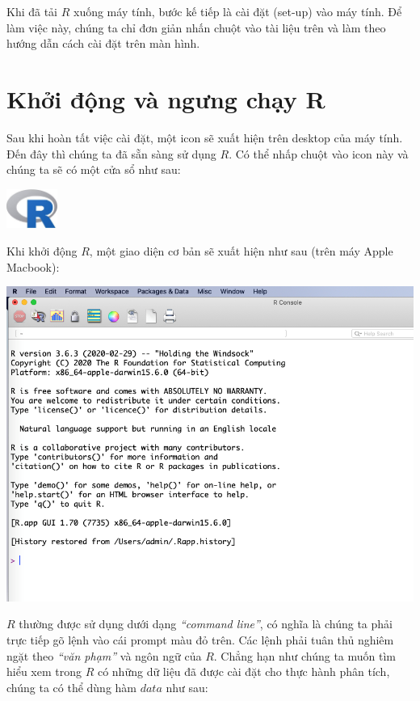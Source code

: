 \documentclass[
]{book}
\begin{document}
Khi đã tải \(R\) xuống máy tính, bước kế tiếp là cài đặt (set-up) vào máy tính. Để làm việc này, chúng ta chỉ đơn giản nhấn chuột vào tài liệu trên và làm theo hướng dẫn cách cài đặt trên màn hình.

\hypertarget{khux1edfi-ux111ux1ed9ng-vuxe0-ngux1b0ng-chux1ea1y-r}{%
\section{Khởi động và ngưng chạy R}\label{khux1edfi-ux111ux1ed9ng-vuxe0-ngux1b0ng-chux1ea1y-r}}

Sau khi hoàn tất việc cài đặt, một icon sẽ xuất hiện trên desktop của máy tính. Đến đây thì chúng ta đã sẵn sàng sử dụng \(R\). Có thể nhấp chuột vào icon này và chúng ta sẽ có một cửa sổ như sau:

\includegraphics[width=0.65625in,height=0.50764in]{_book_media/Figures/1.1.jpg}

Khi khởi động \(R\), một giao diện cơ bản sẽ xuất hiện như sau (trên máy Apple Macbook):

\includegraphics{_book_media/Figures/1.2.png}

\(R\) thường được sử dụng dưới dạng \emph{``command line''}, có nghĩa là chúng ta phải trực tiếp gõ lệnh vào cái prompt màu đỏ trên. Các lệnh phải tuân thủ nghiêm ngặt theo \emph{``văn phạm''} và ngôn ngữ của \(R\). Chẳng hạn như chúng ta muốn tìm hiểu xem trong \(R\) có những dữ liệu đã được cài đặt cho thực hành phân tích, chúng ta có thể dùng hàm \(data\) như sau:
\end{document}
